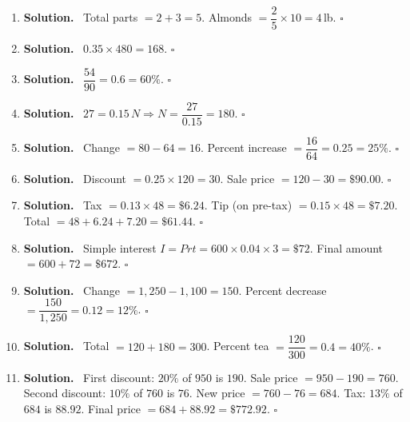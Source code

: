 \documentclass[12pt]{article}
\newenvironment{solution}{\par\noindent\textbf{Solution.}\ }{\hfill$\square$\par}
\begin{document}
\begin{enumerate}
\item \begin{solution}
Total parts $=2+3=5$. Almonds $=\dfrac{2}{5}\times 10=4\,$lb.
\end{solution}

\item \begin{solution}
$0.35\times480=168$.
\end{solution}

\item \begin{solution}
$\dfrac{54}{90}=0.6=60\%$.
\end{solution}

\item \begin{solution}
$27=0.15\,N\Rightarrow N=\dfrac{27}{0.15}=180$.
\end{solution}

\item \begin{solution}
Change $=80-64=16$. Percent increase $=\dfrac{16}{64}=0.25=25\%$.
\end{solution}

\item \begin{solution}
Discount $=0.25\times120=30$. Sale price $=120-30=\$90.00$.
\end{solution}

\item \begin{solution}
Tax $=0.13\times48=\$6.24$. Tip (on pre-tax) $=0.15\times48=\$7.20$. Total $=48+6.24+7.20=\$61.44$.
\end{solution}

\item \begin{solution}
Simple interest $I=Prt=600\times0.04\times3=\$72$. Final amount $=600+72=\$672$.
\end{solution}

\item \begin{solution}
Change $=1{,}250-1{,}100=150$. Percent decrease $=\dfrac{150}{1{,}250}=0.12=12\%$.
\end{solution}

\item \begin{solution}
Total $=120+180=300$. Percent tea $=\dfrac{120}{300}=0.4=40\%$.
\end{solution}

\item \begin{solution}
First discount: $20\%$ of $950$ is $190$. Sale price $=950-190=760$. Second discount: $10\%$ of $760$ is $76$. New price $=760-76=684$. Tax: $13\%$ of $684$ is $88.92$. Final price $=684+88.92=\$772.92$.
\end{solution}

\end{enumerate}
\end{document}
